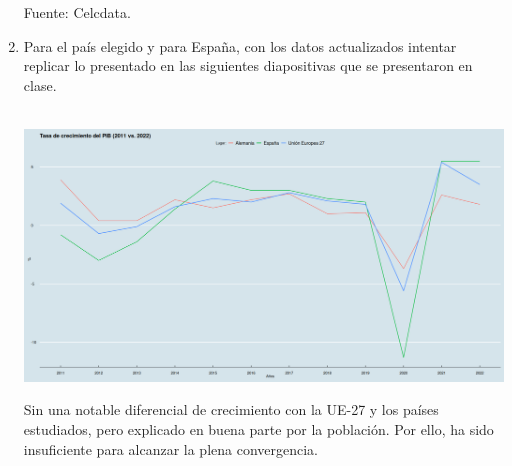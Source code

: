 \begin{enumerate}
    \begin{table}[htbp]
      \centering
      \caption{Contabilidad del crecimiento Alemán}
      \label{tab:addlabel}%
      \begin{center}
      \tiny Fuente: Celcdata.
      \end{center}
    \end{table}

    \item Para el país elegido y para España, con los datos actualizados intentar replicar lo presentado en las siguientes diapositivas que se presentaron en clase.\\\\

    \begin{center}
	\includegraphics[scale=.29]{image/b4ej1_1.png}
    \end{center}

    Sin una notable diferencial de crecimiento con la UE-27 y los países estudiados, pero explicado en buena parte por la población. Por ello, ha sido insuficiente para alcanzar la plena convergencia.

\end{enumerate}
